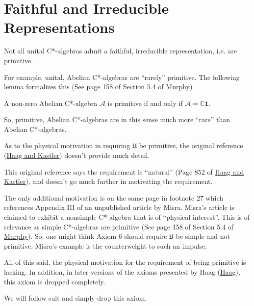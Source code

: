 \section{Faithful and Irreducible Representations}\label{sctn:faithful-and-irreducible-representations}
Not all unital C*-algebras admit a faithful, irreducible representation, i.e. are primitive.

For example, unital, Abelian C*-algebras are ``rarely'' primitive. The following lemma formalizes this (See page 158 of Section 5.4 of \href{https://doi.org/10.1016/C2009-0-22289-6}{Murphy})
\begin{lemma}
A non-zero Abelian C*-algebra $\mathcal{A}$ is primitive if and only if $\mathcal{A} = \mathbb{C} \mathbf{1}$.
\end{lemma}

So, primitive, Abelian C*-algebras are in this sense much more ``rare'' than Abelian C*-algebras.

As to the physical motivation in requiring $\mathfrak{U}$ be primitive, the original reference (\href{https://doi.org/10.1063/1.1704187}{Haag and Kastler}) doesn't provide much detail.

This original reference says the requirement is ``natural'' (Page 852 of \href{https://doi.org/10.1063/1.1704187}{Haag and Kastler}), and doesn't go much further in motivating the requirement.

The only additional motivation is on the same page in footnote 27 which references Appendix III of an unpublished article by Misra. Misra's article is claimed to exhibit a nonsimple C*-algebra that is of ``physical interest''. This is of relevance as simple C*-algebras are primitive (See page 158 of Section 5.4 of \href{https://doi.org/10.1016/C2009-0-22289-6}{Murphy}). So, one might think Axiom 6 should require $\mathfrak{U}$ be simple and not primitive. Misra's example is the counterweight to such an impulse.

All of this said, the physical motivation for the requirement of being primitive is lacking. In addition, in later versions of the axioms presented by Haag (\href{https://doi.org/10.1007/978-3-642-61458-3}{Haag}), this axiom is dropped completely.

We will follow suit and simply drop this axiom.

